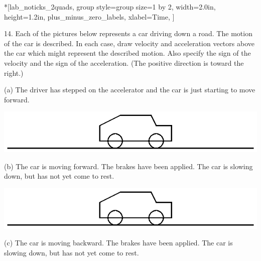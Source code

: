 
\begin{lab_groupplot}*{}[lab_noticks_2quads,
	group style={group size=1 by 2},
	width=2.0in,  height=1.2in,
	plus_minus_zero_labels,
	xlabel=Time,
	]
\nextgroupplot[
	ylabel=Velocity,
	]
\nextgroupplot[
	ylabel=Acceleration,
	]
\end{lab_groupplot}

14. Each of the pictures below represents a car driving down a road. The motion
of the car is described. In each case, draw velocity and acceleration vectors
above the car which might represent the described motion. Also specify the sign
of the velocity and the sign of the acceleration. (The positive direction is toward the right.)

(a) The driver has stepped on the accelerator and the car is just starting to
move forward.

\vspace{0.3cm}
{\par\centering \includegraphics{slowing/slowing_fig16.eps} \par}
\vspace{0.3cm}

(b) The car is moving forward. The brakes have been applied. The car is slowing
down, but has not yet come to rest.

\vspace{0.3cm}
{\par\centering \includegraphics{slowing/slowing_fig16.eps} \par}
\vspace{0.3cm}

(c) The car is moving backward. The brakes have been applied. The car is slowing down, but has not yet come to rest.

